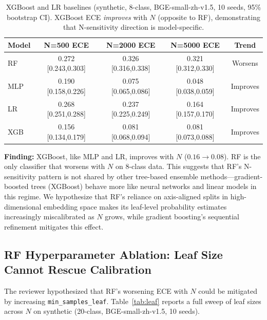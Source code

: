 \documentclass[11pt]{article}
\begin{document}
\begin{table}[t]
\centering
\caption{XGBoost and LR baselines (synthetic, 8-class, BGE-small-zh-v1.5, 10 seeds, 95\% bootstrap CI). XGBoost ECE \emph{improves} with $N$ (opposite to RF), demonstrating that N-sensitivity direction is model-specific.}
\label{tab:xgb}
\begin{tabular}{@{}lcccc@{}}
\toprule
\textbf{Model} & \textbf{N=500 ECE} & \textbf{N=2000 ECE} & \textbf{N=5000 ECE} & \textbf{Trend} \\
\midrule
RF   & 0.272 [0.243,0.303] & 0.326 [0.316,0.338] & 0.321 [0.312,0.330] & Worsens \\
MLP  & 0.190 [0.158,0.226] & 0.075 [0.065,0.086] & 0.048 [0.038,0.059] & Improves \\
LR   & 0.268 [0.251,0.288] & 0.237 [0.225,0.249] & 0.164 [0.157,0.170] & Improves \\
XGB  & 0.156 [0.134,0.179] & 0.081 [0.068,0.094] & 0.081 [0.073,0.088] & Improves \\
\bottomrule
\end{tabular}
\end{table}

\textbf{Finding:} XGBoost, like MLP and LR, improves with $N$ ($0.16\to 0.08$). RF is the only classifier that worsens with $N$ on 8-class data. This suggests that RF's N-sensitivity pattern is not shared by other tree-based ensemble methods---gradient-boosted trees (XGBoost) behave more like neural networks and linear models in this regime. We hypothesize that RF's reliance on axis-aligned splits in high-dimensional embedding space makes its leaf-level probability estimates increasingly miscalibrated as $N$ grows, while gradient boosting's sequential refinement mitigates this effect.

\subsection{RF Hyperparameter Ablation: Leaf Size Cannot Rescue Calibration}

The reviewer hypothesized that RF's worsening ECE with $N$ could be mitigated by increasing \texttt{min\_samples\_leaf}. Table~\ref{tab:leaf} reports a full sweep of leaf sizes across $N$ on synthetic (20-class, BGE-small-zh-v1.5, 10 seeds).
\end{document}
